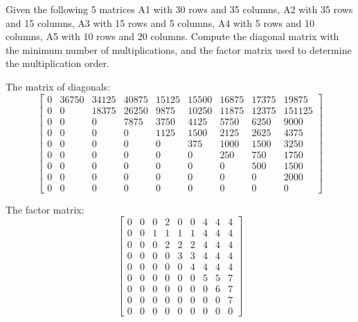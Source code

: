 \documentclass[12pt,letterpaper,twoside]{hmcpset}
\begin{document}
\begin{problem}[2]
 Given the following 5 matrices A1 with 30 rows and 35 columns, A2 with 35 rows and 15 columns, A3 with 15 rows and 5 columns, A4 with 5 rows and 10 columns, A5 with 10 rows and 20 columns.  Compute the diagonal matrix with the minimum number of multiplications, and the factor matrix used to determine the multiplication order. 
\end{problem}

\begin{solution}
The matrix of diagonals:
\[
\begin{bmatrix}
0 & 36750 & 34125 & 40875 & 15125 & 15500 & 16875 & 17375 & 19875\\
0 & 0 & 18375 & 26250 & 9875 & 10250 & 11875 & 12375 & 151125\\
0 & 0 & 0 & 7875 & 3750 & 4125 & 5750 & 6250 & 9000\\
0 & 0 & 0 & 0 & 1125 & 1500 & 2125 & 2625 & 4375\\
0 & 0 & 0 & 0 & 0 & 375 & 1000 & 1500 & 3250\\
0 & 0 & 0 & 0 & 0 & 0 & 250 & 750 & 1750\\
0 & 0 & 0 & 0 & 0 & 0 & 0 & 500 & 1500\\
0 & 0 & 0 & 0 & 0 & 0 & 0 & 0 & 2000\\
0 & 0 & 0 & 0 & 0 & 0 & 0 & 0 & 0
\end{bmatrix}
\]

The factor matrix:
\[
\begin{bmatrix}
0 & 0 & 0 & 2 & 0 & 0 & 4 & 4 & 4\\
0 & 0 & 1 & 1 & 1 & 1 & 4 & 4 & 4\\
0 & 0 & 0 & 2 & 2 & 2 & 4 & 4 & 4\\
0 & 0 & 0 & 0 & 3 & 3 & 4 & 4 & 4\\
0 & 0 & 0 & 0 & 0 & 4 & 4 & 4 & 4\\
0 & 0 & 0 & 0 & 0 & 0 & 5 & 5 & 7\\
0 & 0 & 0 & 0 & 0 & 0 & 0 & 6 & 7\\
0 & 0 & 0 & 0 & 0 & 0 & 0 & 0 & 7\\
0 & 0 & 0 & 0 & 0 & 0 & 0 & 0 & 0
\end{bmatrix}
\]

\end{solution}
\end{document}
